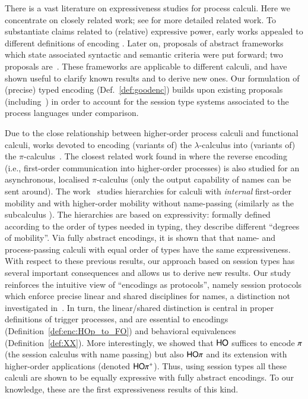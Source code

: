 There is a vast literature on expressiveness studies for process calculi. 
Here we concentrate on closely related work; 
see \cite{KouzapasPY15} for more detailed related work. 
To substantiate claims related to (relative) expressive power,
early works appealed to different definitions of encoding \cite{Palamidessi03}.
Later on, 
proposals of abstract 
frameworks which 
state associated syntactic and semantic criteria 
were put forward; 
two proposals are~\cite{DBLP:journals/iandc/Gorla10,DBLP:journals/tcs/FuL10}. 
These frameworks are applicable to different calculi, and 
have shown useful to clarify known results and to derive new ones.
Our formulation of (precise) typed encoding (Def.~\ref{def:goodenc}) 
builds upon existing proposals (including~\cite{Palamidessi03,DBLP:journals/iandc/Gorla10,DBLP:conf/icalp/LanesePSS10})
in order to account for the session type systems
associated to the process languages under comparison.

Due to the close relationship between
higher-order process calculi and functional calculi, works devoted to
encoding (variants of) the $\lambda$-calculus into (variants of) the
$\pi$-calculus~\cite{San92,DBLP:journals/tcs/Fu99}. 
The closest related work found in \cite{SaWabook} where 
the reverse
encoding (i.e., first-order communication into higher-order processes)
is also studied for an asynchronous, localised $\pi$-calculus
(only the output capability of names can be sent around).  The
work~\cite{San96int} studies hierarchies for calculi with
\emph{internal} first-order mobility and with higher-order mobility
without name-passing (similarly as the subcalculus \HO). The
hierarchies are based on expressivity: formally defined according to
the order of types needed in typing, they describe different ``degrees
of mobility''.  Via fully abstract encodings, it is shown that that
name- and process-passing calculi with equal order of types have the
same expressiveness.  With respect to these previous results, our
approach based on session types has several important consequences and
allows us to derive new results.  Our study reinforces the intuitive
view of ``encodings as protocols'', namely session protocols which
enforce precise linear and shared disciplines for names, a distinction
not investigated in~\cite{SangiorgiD:expmpa,DBLP:journals/tcs/Sangiorgi01}. In
turn, the linear/shared distinction is central in proper definitions
of trigger processes, and are essential to encodings
(Definition~\ref{def:enc:HOp_to_FO}) and behavioral equivalences
(Definition~\ref{def:XX}).  More interestingly, we showed that
$\mathsf{HO}$ suffices to encode $\pi$ (the session
calculus with name passing) but also $\mathsf{HO}\pi$ and its extension with
higher-order applications (denoted $\mathsf{HO\pi^{+}}$). Thus, using session types
all these calculi are shown to be equally expressive with fully
abstract encodings.  To our knowledge, these are the first
expressiveness results of this kind.

